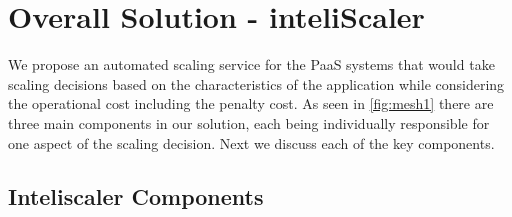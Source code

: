 \section{Overall Solution - inteliScaler }
We propose an automated scaling service for the PaaS systems that would take scaling decisions based on the characteristics of the application while considering the operational cost including the penalty cost. As seen in  \ref{fig:mesh1} there are three main components in our solution, each being individually responsible for one aspect of the scaling decision. Next we discuss each of the key components.\\

\subsection{Inteliscaler Components}